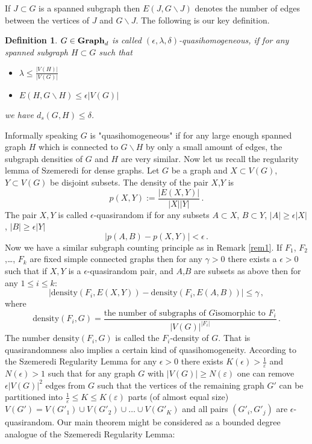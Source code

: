 \documentclass{article}
\newtheorem{defin}{Definition}[section]
\newcommand{\ep}{\varepsilon}
\newcommand{\e}{\ep}
\newcommand{\Gd}[1][d]{\textrm{\textbf{Graph}}_{#1}}
\begin{document}
\noindent
If $J\subset G$ is a spanned subgraph then $E(J, G\backslash J)$ denotes
the number of edges between the vertices of $J$ and $G\backslash J$.
The following is our key definition.
\begin{defin}
$G\in\Gd$ is called $(\epsilon,\lambda,\delta)$-quasihomogeneous, if
for any spanned subgraph $H\subset G$ such that
\begin{itemize}
\item $\lambda\leq \frac{|V(H)|}{|V(G)|}$
\item $E(H, G\backslash H)\leq \epsilon|V(G)|$
\end{itemize}
we have $d_s(G,H)\leq \delta$.
\end{defin}
Informally speaking $G$ is "quasihomogeneous" if for any large enough
spanned graph $H$ which is connected to $G\backslash H$ by only a small
amount of edges, the subgraph densities of $G$ and $H$ are 
very similar.
Now let us recall the regularity lemma of Szemeredi for
dense graphs. Let $G$ be a graph and
$X\subset V(G)$, $Y\subset V(G)$ be disjoint subsets. The density
of the pair $X$,$Y$ is
$$p(X,Y):=\frac{|E(X,Y)|}{|X||Y|}\,.$$
The pair $X,Y$ is called $\epsilon$-quasirandom if for any subsets
$A\subset X$, $B\subset Y$, $|A|\geq\epsilon |X|$, $|B|\geq\epsilon |Y|$
$$|p(A,B)-p(X,Y)|<\epsilon\,.$$
Now we have a similar subgraph counting principle as in Remark \ref{rem1}.
If $F_1$, $F_2$,\dots, $F_k$ are fixed simple connected graphs
then for any $\gamma>0$ there exists a $\epsilon>0$ such that if
$X,Y$ is a $\epsilon$-quasirandom pair, and $A$,$B$ are subsets
as above then for any $1\leq i \leq k$:
$$|\mbox{density}(F_i,E(X,Y))-\mbox{density}(F_i,E(A,B))|\leq\gamma\,,$$
where
$$\mbox{density}(F_i,G)=\frac{\mbox{the number of subgraphs of $G$
isomorphic to $F_i$}}{|V(G)|^{|F_i|}}\,.$$
The number $\mbox{density}(F_i,G)$ is called the $F_i$-density of $G$.
That is quasirandomness also implies a certain kind of quasihomogeneity.
According to the Szemeredi Regularity Lemma for any $\epsilon>0$
there exists $K(\epsilon)>\frac{1}{\e}$ and $N(\epsilon)>1$ such that for any 
graph $G$ with $|V(G)|\geq N(\e)$ one can remove $\epsilon |V(G)|^2$ edges
from $G$ such that the vertices of the
 remaining graph $G'$ can be partitioned into
$\frac{1}{\e}\leq K \leq K(\e)$ parts (of almost equal size)
 $V(G')=V(G'_1)\cup V(G'_2)\cup\dots\cup V(G'_K)$ and all pairs 
$(G'_i,G'_j)$ are
$\epsilon$-quasirandom. Our main theorem might be considered as a bounded
degree analogue of the Szemeredi Regularity Lemma:
\end{document}
